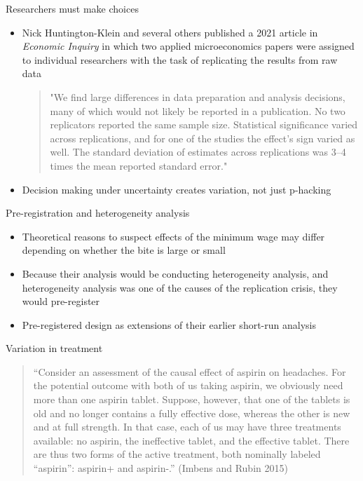 \documentclass{beamer}
\begin{document}
\begin{frame}{Researchers must make choices}

\begin{itemize}
\item Nick Huntington-Klein and several others published a 2021 article in \emph{Economic Inquiry} in which two applied microeconomics papers were assigned to individual researchers with the task of replicating the results from raw data
\begin{quote}
"We find large differences in data preparation and analysis decisions, many of which would not likely be reported in a publication. No two replicators reported the same sample size. Statistical significance varied across replications, and for one of the studies the effect's sign varied as well. The standard deviation of estimates across replications was 3–4 times the mean reported standard error."
\end{quote}
\item Decision making under uncertainty creates variation, not just p-hacking
\end{itemize}

\end{frame}


\begin{frame}{Pre-registration and heterogeneity analysis}

\begin{itemize}
\item Theoretical reasons to suspect effects of the minimum wage may differ depending on whether the bite is large or small
\item Because their analysis would be conducting heterogeneity analysis, and heterogeneity analysis was one of the causes of the replication crisis, they would pre-register
\item Pre-registered design as extensions of their earlier short-run analysis
\end{itemize}

\end{frame}




\begin{frame}{Variation in treatment}


\begin{quote}
``Consider an assessment of the causal effect of aspirin on headaches. For the potential outcome with both of us taking aspirin, we obviously need more than one aspirin tablet.  Suppose, however, that one of the tablets is old and no longer contains a fully effective dose, whereas the other is new and at full strength.  In that case, each of us may have three treatments available: no aspirin, the ineffective tablet, and the effective tablet.  There are thus two forms of the active treatment, both nominally labeled ``aspirin'': aspirin+ and aspirin-.'' (Imbens and Rubin 2015)
\end{quote}

\end{frame}
\end{document}
